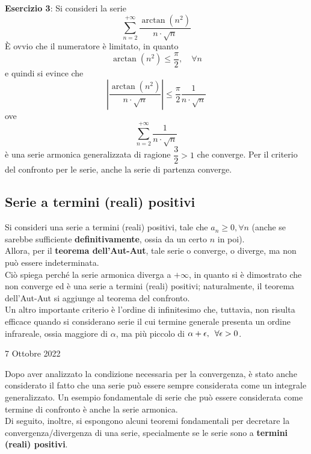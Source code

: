 \documentclass[a4paper]{extarticle}
\begin{document}
\vspace{2em}
\noindent
\textbf{Esercizio 3}: Si consideri la serie
\[\sum_{n=2}^{+\infty} \frac{\arctan(n^2)}{n \cdot \sqrt{n}}\]
È ovvio che il numeratore è limitato, in quanto
\[\arctan(n^2) \leq \frac{\pi}{2}, \hspace{1em} \forall n\]
e quindi si evince che
\[\left \vert \frac{\arctan(n^2)}{n \cdot \sqrt{n}} \right \vert \leq \frac{\pi}{2} \frac{1}{n \cdot \sqrt{n}}\]
ove
\[\sum_{n=2}^{+\infty}  \frac{1}{n \cdot \sqrt{n}}\]
è una serie armonica generalizzata di ragione $\dfrac{3}{2} > 1$ che converge. Per il criterio del confronto per le serie, anche la serie di partenza converge.

\vspace{1em}
\noindent
\subsection{Serie a termini (reali) positivi}
Si consideri una serie a termini (reali) positivi, tale che $a_n \geq 0, \forall n$ (anche se sarebbe sufficiente \textbf{definitivamente}, ossia da un certo $n$ in poi).\\
Allora, per il \textbf{teorema dell'Aut-Aut}, tale serie o converge, o diverge, ma non può essere indeterminata.\\
Ciò spiega perché la serie armonica diverga a $+\infty$, in quanto si è dimostrato che non converge ed è una serie a termini (reali) positivi; naturalmente, il teorema dell'Aut-Aut si aggiunge al teorema del confronto.\\
Un altro importante criterio è l'ordine di infinitesimo che, tuttavia, non risulta efficace quando si considerano serie il cui termine generale presenta un ordine infrareale, ossia maggiore di $\alpha$, ma più piccolo di $\alpha+\epsilon, \hspace{0.5em} \forall \epsilon > 0$.

\newpage
\noindent
\begin{center}
    7 Ottobre 2022
\end{center}
\noindent
Dopo aver analizzato la condizione necessaria per la convergenza, è stato anche considerato il fatto che una serie può essere sempre considerata come un integrale generalizzato. Un esempio fondamentale di serie che può essere considerata come termine di confronto è anche la serie armonica.\\
Di seguito, inoltre, si espongono alcuni teoremi fondamentali per decretare la convergenza/divergenza di una serie, specialmente se le serie sono a \textbf{termini (reali) positivi}.
\end{document}
